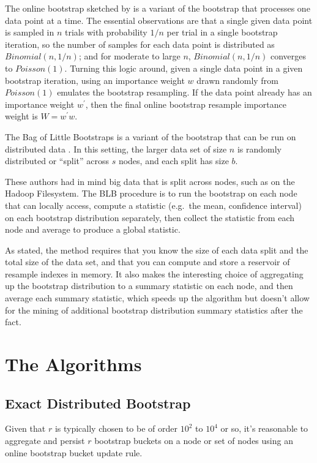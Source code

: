 \documentclass{article}
\begin{document}
The online bootstrap sketched by \cite{bib:onlineboot} is a variant of the
bootstrap that processes one data point at a time.  The essential observations
are that a single given data point is sampled in $n$ trials with probability
$1/n$ per trial in a single bootstrap iteration, so the number of samples for
each data point is distributed as $Binomial(n,1/n)$; and for moderate to large
$n$, $Binomial(n,1/n)$ converges to $Poisson(1)$.  Turning this logic around,
given a single data point in a given bootstrap iteration, using an importance
weight $w$ drawn randomly from $Poisson(1)$ emulates the bootstrap resampling.
If the data point already has an importance weight $w^{\prime}$, then the
final online bootstrap resample importance weight is $W = w^{\prime}w$.

The Bag of Little Bootstraps is a variant of the bootstrap that can be run on distributed 
data \cite{bib:blb}. In this setting, the larger data set of size $n$ is randomly distributed or ``split''
across $s$ nodes, and each split has size $b$.  

These authors had in mind
big data that is split across nodes, such as on the Hadoop Filesystem. The BLB
procedure is to run the bootstrap on each node that can locally access,
compute a statistic (e.g.\ the mean, confidence interval) on each bootstrap
distribution separately, then collect the statistic from each node and average
to produce a global statistic.

As stated, the method requires that you know the size of each data split and
the total size of the data set, and that you can compute and store a reservoir
of resample indexes in memory. It also makes the interesting choice of
aggregating up the bootstrap distribution to a summary statistic on each node,
and then average each summary statistic, which speeds up the algorithm but
doesn't allow for the mining of additional bootstrap distribution summary
statistics after the fact.

\section{The Algorithms}

\subsection{Exact Distributed Bootstrap}

Given that $r$ is typically chosen to be of order $10^2$ to $10^4$ or so, it's
reasonable to aggregate and persist $r$ bootstrap buckets on a node or set of
nodes using an online bootstrap bucket update rule.
\end{document}
